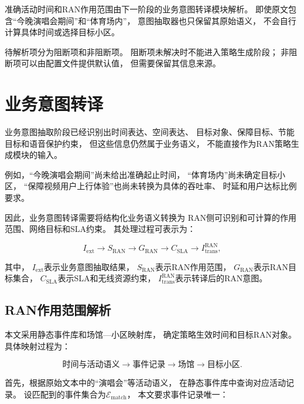\documentclass[lang=cn,12pt]{elegantbook}
\begin{document}
准确活动时间和RAN作用范围由下一阶段的业务意图转译模块解析。
即使原文包含“今晚演唱会期间”和“体育场内”，
意图抽取器也只保留其原始语义，
不会自行计算具体时间或选择目标小区。

待解析项分为阻断项和非阻断项。
阻断项未解决时不能进入策略生成阶段；
非阻断项可以由配置文件提供默认值，
但需要保留其信息来源。

\section{业务意图转译}
\label{sec:business_intent_translation}

业务意图抽取阶段已经识别出时间表达、空间表达、
目标对象、保障目标、节能目标和语音保护约束，
但这些信息仍然属于业务语义，
不能直接作为RAN策略生成模块的输入。

例如，“今晚演唱会期间”尚未给出准确起止时间，
“体育场内”尚未确定目标小区，
“保障视频用户上行体验”也尚未转换为具体的吞吐率、
时延和用户达标比例要求。

因此，业务意图转译需要将结构化业务语义转换为
RAN侧可识别和可计算的作用范围、网络目标和SLA约束。
其处理过程可表示为：

\begin{equation}
I_{\mathrm{ext}}
\longrightarrow
S_{\mathrm{RAN}}
\longrightarrow
G_{\mathrm{RAN}}
\longrightarrow
C_{\mathrm{SLA}}
\longrightarrow
I_{\mathrm{trans}}^{\mathrm{RAN}},
\label{eq:intent_translation_reduced}
\end{equation}

其中，
$I_{\mathrm{ext}}$表示业务意图抽取结果，
$S_{\mathrm{RAN}}$表示RAN作用范围，
$G_{\mathrm{RAN}}$表示RAN目标集合，
$C_{\mathrm{SLA}}$表示SLA和无线资源约束，
$I_{\mathrm{trans}}^{\mathrm{RAN}}$表示转译后的RAN意图。


\subsection*{RAN作用范围解析}

本文采用静态事件库和场馆—小区映射库，
确定策略生效时间和目标RAN对象。
具体映射过程为：

\begin{equation}
\text{时间与活动语义}
\rightarrow
\text{事件记录}
\rightarrow
\text{场馆}
\rightarrow
\text{目标小区}.
\label{eq:scope_resolution_chain}
\end{equation}

首先，根据原始文本中的“演唱会”等活动语义，
在静态事件库中查询对应活动记录。
设匹配到的事件集合为$\mathcal{E}_{\mathrm{match}}$，
本文要求事件记录唯一：
\end{document}

